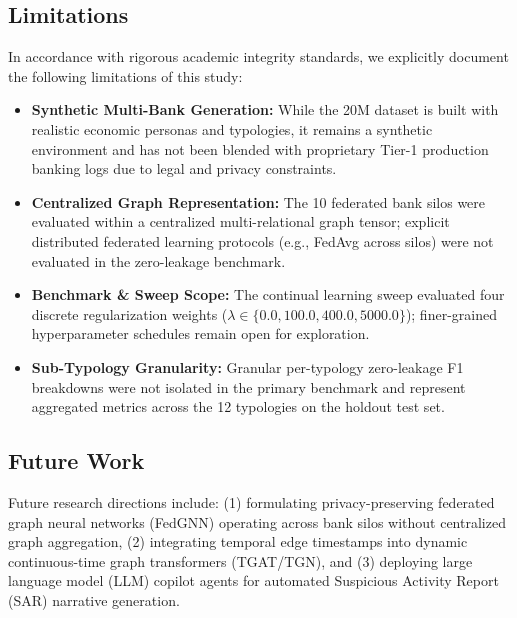 \subsection{Limitations}
In accordance with rigorous academic integrity standards, we explicitly document the following limitations of this study:
\begin{itemize}
    \item \textbf{Synthetic Multi-Bank Generation:} While the 20M dataset is built with realistic economic personas and typologies, it remains a synthetic environment and has not been blended with proprietary Tier-1 production banking logs due to legal and privacy constraints.
    \item \textbf{Centralized Graph Representation:} The 10 federated bank silos were evaluated within a centralized multi-relational graph tensor; explicit distributed federated learning protocols (e.g., FedAvg across silos) were not evaluated in the zero-leakage benchmark.
    \item \textbf{Benchmark & Sweep Scope:} The continual learning sweep evaluated four discrete regularization weights ($\lambda \in \{0.0, 100.0, 400.0, 5000.0\}$); finer-grained hyperparameter schedules remain open for exploration.
    \item \textbf{Sub-Typology Granularity:} Granular per-typology zero-leakage F1 breakdowns were not isolated in the primary benchmark and represent aggregated metrics across the 12 typologies on the holdout test set.
\end{itemize}

\subsection{Future Work}
Future research directions include: (1) formulating privacy-preserving federated graph neural networks (FedGNN) operating across bank silos without centralized graph aggregation, (2) integrating temporal edge timestamps into dynamic continuous-time graph transformers (TGAT/TGN), and (3) deploying large language model (LLM) copilot agents for automated Suspicious Activity Report (SAR) narrative generation.
